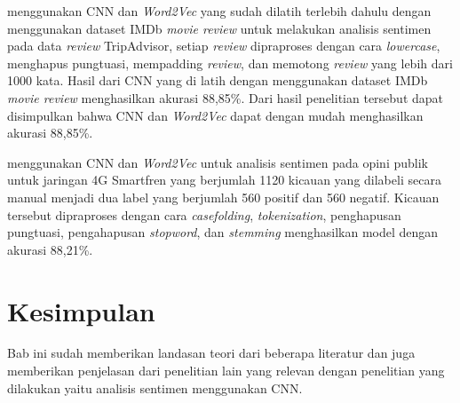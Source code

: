 \citet{Amanatidis2019} menggunakan CNN dan \emph{Word2Vec} yang sudah dilatih terlebih dahulu dengan
menggunakan dataset IMDb \emph{movie review} untuk melakukan analisis sentimen pada data \emph{review}
TripAdvisor, setiap \emph{review} dipraproses dengan cara \emph{lowercase}, menghapus pungtuasi,
mempadding \emph{review}, dan memotong \emph{review} yang lebih dari 1000 kata. Hasil dari CNN yang di
latih dengan menggunakan dataset IMDb \emph{movie review} menghasilkan akurasi 88,85\%. Dari hasil penelitian
tersebut dapat disimpulkan bahwa CNN dan \emph{Word2Vec} dapat dengan mudah menghasilkan akurasi 88,85\%.

\citet{Aldiansyah2019} menggunakan CNN dan \emph{Word2Vec} untuk analisis sentimen pada opini publik
untuk jaringan 4G Smartfren yang berjumlah 1120 kicauan yang dilabeli secara manual menjadi dua label
yang berjumlah 560 positif dan 560 negatif. Kicauan tersebut dipraproses dengan cara \emph{casefolding},
\emph{tokenization}, penghapusan pungtuasi, pengahapusan \emph{stopword}, dan \emph{stemming} menghasilkan
model dengan akurasi 88,21\%.

\section{Kesimpulan}
Bab ini sudah memberikan landasan teori dari beberapa literatur dan juga memberikan penjelasan dari
penelitian lain yang relevan dengan penelitian yang dilakukan yaitu analisis sentimen menggunakan CNN\@.